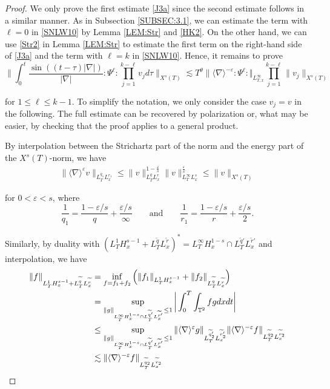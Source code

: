 \documentclass[letterpaper, 11pt,  reqno]{amsart}
\newcommand{\1}{\hspace{0.5mm}\text{I}\hspace{0.5mm}}
\newcommand{\noi}{\noindent}
\newcommand{\T}{\mathbb{T}}
\newcommand{\nb}{\nabla}
\newcommand{\eps}{\varepsilon}
\newcommand{\wt}{\widetilde}
\renewcommand{\l}{\ell}
\newcommand{\les}{\lesssim}
\newcommand{\jb}[1]
{\langle #1 \rangle}
\numberwithin{equation}{section}
\numberwithin{theorem}{section}
\begin{document}
\begin{proof} 
We only prove the first estimate \eqref{J3a} since the second estimate
follows in a similar manner.
As in Subsection \ref{SUBSEC:3.1}, 
we can estimate the term with $\l=0$ in \eqref{SNLW10} 
by Lemma \ref{LEM:Str} and \eqref{HK2}.
On the other hand, we can use \eqref{Str2} in Lemma \ref{LEM:Str}
to estimate 
the first term on the right-hand side of \eqref{J3a}
and 
the term with $\l=k$ in \eqref{SNLW10}.
Hence, it remains to prove
\begin{equation} 
\label{multilinear}  
\bigg\| \int_0^t \frac{\sin ((t-\tau )|\nb|)}{|\nb|} :\!\Psi^\l\!: \prod_{j = 1}^{k-\l}v_j  d\tau \bigg\|_{X^s(T)} 
\les  T^\theta \|\jb{\nb}^{-\eps} :\!\Psi^\l\!: \Vert_{L^\infty_{T, x}} \prod_{j=1}^{k-\l}  \| v_j \|_{X^s(T)}
\end{equation} 

\noi
for $1\leq \l\leq k-1$.
To simplify the notation,  we only consider the case  $v_j=v$ in the following. 
The full estimate can be recovered by polarization or, what may be easier, by checking that the proof applies to a general product. 



By interpolation between the Strichartz part of the norm and the energy part of the $X^s(T)$-norm,
we have
\begin{align}
 \|\jb{\nb}^\eps v \|_{L^{q_1}_T L^{r_1}_x} 
\le \|v \|_{L^{q}_TL^r_x}^{1-\frac{\eps}s}   \| v \|_{L^\infty_T L^s_x}^{\frac{\eps}s}  
\leq \|v \|_{X^s(T)}
\label{J4}
\end{align}



\noi
for $0 <  \eps < s$, where
\[ \frac{1}{q_1} = \frac{1-\eps/s}{q} + \frac{\eps/s}\infty \qquad 
\text{and}\qquad \frac{1}{r_1} = \frac{1-\eps/s}{r} + \frac{\eps/s}2.\] 



Similarly, 
by duality 
with $(L^1_T H^{s-1}_x+L^{\wt q}_T L^{\wt r}_x )^*
= L^\infty_T H^{1-s}_x \cap L^{\wt q'}_T L^{\wt r'}_x $
and interpolation, we have
\begin{align}
\| f \|_{L^1_T H^{s-1}_x+L^{\wt q}_T L^{\wt r}_x }
& = 
 \inf_{f = f_1+f_2} \Big(  
\| f_1 \|_{L^1_T H^{s-1}_x} +\| f_2 \|_{L^{\wt q}_T L^{\wt r}_x }\Big) \notag\\
& = \sup_{\|g\|_{L^\infty_T H^{1-s}_x \cap L^{\wt q'}_T L^{\wt r'}_x }\leq 1}
\bigg|\int_0^T \int_{\T^2} 
f g dx dt\bigg|\notag\\
& \le \sup_{\|g\|_{L^\infty_T H^{1-s}_x \cap L^{\wt q'}_T L^{\wt r'}_x }\leq 1}
 \| \jb{\nb}^{\eps} g \|_{L^{\wt q_2'}_T  L^{\wt r_2'}_x} 
 \| \jb{\nb}^{-\eps} f \|_{L^{\wt q_2}_T  L^{\wt r_2}_x} \notag\\
 & \les  \| \jb{\nb}^{-\eps} f \|_{L^{\wt q_2}_T  L^{\wt r_2}_x} 
\label{J5}
\end{align}



\end{proof}
\end{document}
